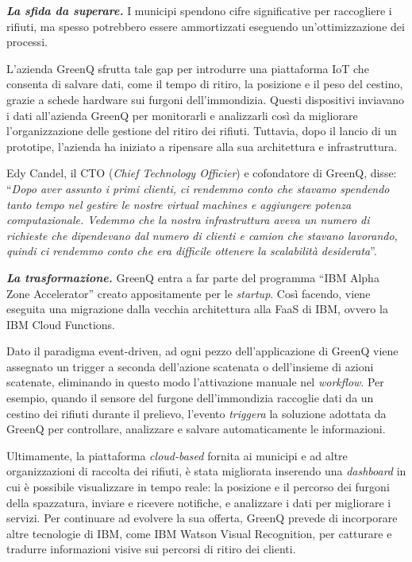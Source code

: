 \documentclass[a4paper]{article}
\newcommand{\dquotes}[1]{``#1''}
\begin{document}
	\noindent
	\textbf{\emph{La sfida da superare.}} I municipi spendono cifre significative per raccogliere i rifiuti, ma spesso potrebbero essere ammortizzati eseguendo un'ottimizzazione dei processi.
	
	L'azienda GreenQ sfrutta tale gap per introdurre una piattaforma IoT che consenta di salvare dati, come il tempo di ritiro, la posizione e il peso del cestino, grazie a schede hardware sui furgoni dell'immondizia. Questi dispositivi inviavano i dati all'azienda GreenQ per monitorarli e analizzarli così da migliorare l'organizzazione delle gestione del ritiro dei rifiuti. Tuttavia, dopo il lancio di un prototipe, l'azienda ha iniziato a ripensare alla sua architettura e infrastruttura.
	
	Edy Candel, il CTO (\emph{Chief Technology Officier}) e cofondatore di GreenQ, disse: \dquotes{\emph{Dopo aver assunto i primi clienti, ci rendemmo conto che stavamo spendendo tanto tempo nel gestire le nostre virtual machines e aggiungere potenza computazionale. Vedemmo che la nostra infrastruttura aveva un numero di richieste che dipendevano dal numero di clienti e camion che stavano lavorando, quindi ci rendemmo conto che era difficile ottenere la scalabilità desiderata}}.\newline
	
	\noindent
	\textbf{\emph{La trasformazione.}} GreenQ entra a far parte del programma \dquotes{IBM Alpha Zone Accelerator} creato appositamente per le \emph{startup}. Così facendo, viene eseguita una migrazione dalla vecchia architettura alla FaaS di IBM, ovvero la IBM Cloud Functions.
	
	Dato il paradigma event-driven, ad ogni pezzo dell'applicazione di GreenQ viene assegnato un trigger a seconda dell'azione scatenata o dell'insieme di azioni scatenate, eliminando in questo modo l'attivazione manuale nel \emph{workflow}. Per esempio, quando il sensore del furgone dell'immondizia raccoglie dati da un cestino dei rifiuti durante il prelievo, l'evento \emph{triggera} la soluzione adottata da GreenQ per controllare, analizzare e salvare automaticamente le informazioni.
	
	Ultimamente, la piattaforma \emph{cloud-based} fornita ai municipi e ad altre organizzazioni di raccolta dei rifiuti, è stata migliorata inserendo una \emph{dashboard} in cui è possibile visualizzare in tempo reale: la posizione e il percorso dei furgoni della spazzatura, inviare e ricevere notifiche, e analizzare i dati per migliorare i servizi. Per continuare ad evolvere la sua offerta, GreenQ prevede di incorporare altre tecnologie di IBM, come IBM Watson Visual Recognition, per catturare e tradurre informazioni visive sui percorsi di ritiro dei clienti.
	
\end{document}
